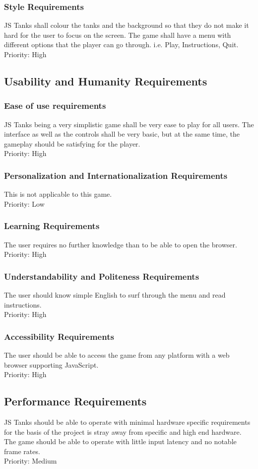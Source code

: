 \documentclass[12pt, titlepage]{article}
\begin{document}
\subsubsection{Style Requirements}
JS Tanks shall colour the tanks and the background so that they do not make it
hard for the user to focus on the screen. The game shall have a menu with
different options that the player can go through. i.e. Play, Instructions, Quit.\\Priority: High
\subsection{Usability and Humanity Requirements}
\subsubsection{Ease of use requirements}
JS Tanks being a very simplistic game shall be very ease to play for all users. 
The interface as well as the controls shall be very basic, but at the same time, 
the gameplay should be satisfying for the player. \\Priority: High
\subsubsection{Personalization and Internationalization Requirements}
This is not applicable to this game. \\Priority: Low
\subsubsection{Learning Requirements}
The user requires no further knowledge than to be able to open the browser.\\Priority: High
\subsubsection{Understandability and Politeness Requirements}
The user should know simple English to surf through the menu and read 
instructions.\\Priority: High
\subsubsection{Accessibility Requirements}
The user should be able to access the game from any platform with a web browser 
supporting JavaScript.\\Priority: High
\subsection{Performance Requirements}
JS Tanks should be able to operate with minimal hardware specific requirements 
for the basis of the project is stray away from specific and high end hardware. 
The game should be able to operate with little input latency and no notable 
frame rates.\\Priority: Medium
\end{document}
